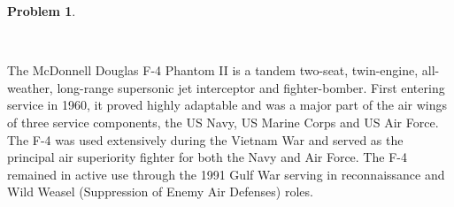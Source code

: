 \documentclass[10pt]{article}
\theoremstyle{definition}
\newtheorem{prob}{Problem}[section]
\begin{document}
\clearpage\newpage
\begin{prob}
     \begin{figure}[h]
        \centering
        ~
     \end{figure}
     The McDonnell Douglas F-4 Phantom II is a tandem two-seat, twin-engine, all-weather, long-range supersonic jet interceptor and fighter-bomber.
     First entering service in 1960, it proved highly adaptable and was a major part of the air wings of three service components, the US Navy, US Marine Corps and US Air Force.
     The F-4 was used extensively  during the Vietnam War and served as the principal air superiority fighter for both the Navy and Air Force.
     The F-4 remained in active use through the 1991 Gulf War serving in reconnaissance and Wild Weasel (Suppression of Enemy Air Defenses) roles.
    

\end{prob}
\end{document}
